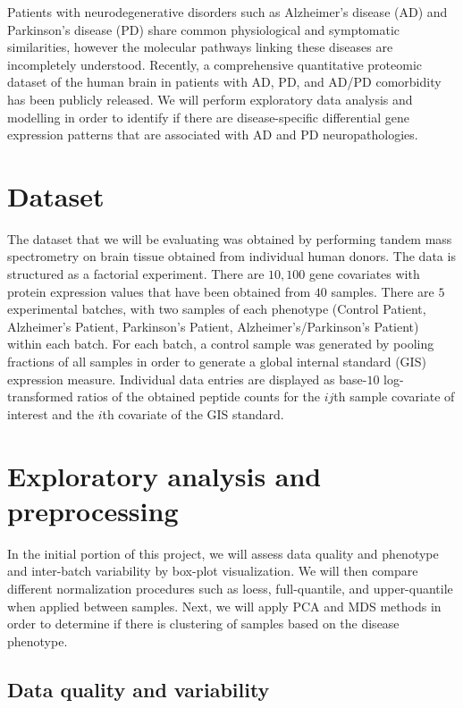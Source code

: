 Patients with neurodegenerative disorders such as Alzheimer’s disease (AD) and Parkinson’s disease (PD) share common physiological and symptomatic similarities, however the molecular pathways linking these diseases are incompletely understood. Recently, a comprehensive quantitative proteomic dataset of the human brain in patients with AD, PD, and AD/PD comorbidity has been publicly released. We will perform exploratory data analysis and modelling in order to identify if there are disease-specific differential gene expression patterns that are associated with AD and PD neuropathologies.



\section{Dataset}
\label{sec:dataset}


The dataset\cite{proteome} that we will be evaluating was obtained by performing tandem mass spectrometry on brain tissue obtained from individual human donors. The data is structured as a factorial experiment. There are $10,100$ gene covariates with protein expression values that have been obtained from $40$ samples. There are $5$ experimental batches, with two samples of each phenotype (Control Patient, Alzheimer’s Patient, Parkinson’s Patient, Alzheimer’s/Parkinson’s Patient) within each batch. For each batch, a control sample was generated by pooling fractions of all samples in order to generate a global internal standard (GIS) expression measure. Individual data entries are displayed as base-$10$ log-transformed ratios of the obtained peptide counts for the $ij$th sample covariate of interest and the $i$th covariate of the GIS standard.

\section{Exploratory analysis and preprocessing}
\label{sec:expl-analys-prepr}

 In the initial portion of this project, we will assess data quality and phenotype and  inter-batch variability by box-plot visualization. We will then compare different normalization procedures such as loess, full-quantile, and upper-quantile when applied between samples. Next, we will apply PCA and MDS methods in order to determine if there is clustering of samples based on the disease phenotype.


\subsection{Data quality and variability}
\label{subsec:data-qual-vari}

